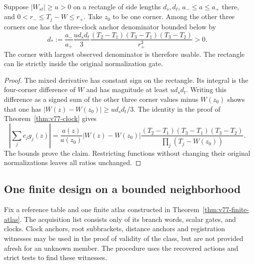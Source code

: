 \begin{proposition}
\label{prop:v78-anchor-bound}
Suppose $|W_{st}|\ge u>0$ on a rectangle of side lengths $d_s,d_t$,
$a_-\le a\le a_+$ there, and $0<r_-\le T_j-W\le r_+$.
Take $z_0$ to be one corner.  Among the other three corners one has the
three-clock anchor denominator bounded below by
\begin{equation}\label{eq:v78-anchor-bound}
 d_*:=\frac{a_-}{a_+}\frac{u d_s d_t}{3}
 \frac{(T_2-T_1)(T_3-T_1)(T_3-T_2)}{r_+^3}>0.
\end{equation}
The corner with largest observed denominator is therefore usable.  The
rectangle can lie strictly inside the original normalization gate.
\end{proposition}
\begin{proof}
The mixed derivative has constant sign on the rectangle.  Its integral
is the four-corner difference of $W$ and has magnitude at least
$u d_s d_t$.  Writing this difference as a signed sum of the other
three corner values minus $W(z_0)$ shows that one has
$|W(z)-W(z_0)|\ge u d_s d_t/3$.
The identity in the proof of Theorem~\ref{thm:v77-clock} gives
\[
 \left|\sum_jc_jg_j(z)\right|
 =\frac{a(z)}{a(z_0)}|W(z)-W(z_0)|
   \frac{(T_2-T_1)(T_3-T_1)(T_3-T_2)}
        {\prod_j(T_j-W(z_0))}.
\]
The bounds prove the claim.  Restricting functions without changing
their original normalizations leaves all ratios unchanged.
\end{proof}

\subsection{One finite design on a bounded neighborhood}
Fix a reference table and one finite atlas constructed in
Theorem~\ref{thm:v77-finite-atlas}.  The acquisition list consists only
of its branch words, scalar gates, and clocks.  Clock anchors, root
subbrackets, distance anchors and registration witnesses may be used
in the proof of validity of the class, but are not provided afresh for
an unknown member.  The procedure uses the recovered actions and
strict tests to find these witnesses.

